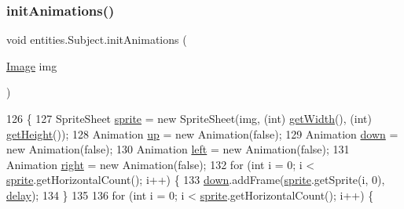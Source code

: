\subsubsection{\texorpdfstring{init\+Animations()}{initAnimations()}}
{\footnotesize\ttfamily void entities.\+Subject.\+init\+Animations (\begin{DoxyParamCaption}\item[{\mbox{\hyperlink{classorg_1_1newdawn_1_1slick_1_1_image}{Image}}}]{img }\end{DoxyParamCaption})\hspace{0.3cm}{\ttfamily [inline]}}


\begin{DoxyCode}
126                                           \{
127         SpriteSheet \mbox{\hyperlink{classentities_1_1_physical_entity_aeb439b2308ab19fb6d3ff6be6f7cdbd8}{sprite}} = \textcolor{keyword}{new} SpriteSheet(img, (\textcolor{keywordtype}{int}) \mbox{\hyperlink{classorg_1_1newdawn_1_1slick_1_1geom_1_1_rectangle_ae2fddc33461303a9ccf8854c1e93c9c1}{getWidth}}(), (\textcolor{keywordtype}{int}) 
      \mbox{\hyperlink{classorg_1_1newdawn_1_1slick_1_1geom_1_1_rectangle_a6c8878e73b4ca0d7a3c2d4e6bcd421ee}{getHeight}}());
128         Animation \mbox{\hyperlink{classentities_1_1_subject_a48b885eabce7dd717959986004da6fd8}{up}} = \textcolor{keyword}{new} Animation(\textcolor{keyword}{false});
129         Animation \mbox{\hyperlink{classentities_1_1_subject_acf3cbe158b93cc059365ae49dec13572}{down}} = \textcolor{keyword}{new} Animation(\textcolor{keyword}{false});
130         Animation \mbox{\hyperlink{classentities_1_1_subject_a79b849ac8ec3b04db878e9a15f43284b}{left}} = \textcolor{keyword}{new} Animation(\textcolor{keyword}{false});
131         Animation \mbox{\hyperlink{classentities_1_1_subject_a6a1ee4276efe4d5cc885288de3a812b0}{right}} = \textcolor{keyword}{new} Animation(\textcolor{keyword}{false});
132         \textcolor{keywordflow}{for} (\textcolor{keywordtype}{int} i = 0; i < \mbox{\hyperlink{classentities_1_1_physical_entity_aeb439b2308ab19fb6d3ff6be6f7cdbd8}{sprite}}.getHorizontalCount(); i++) \{
133             \mbox{\hyperlink{classentities_1_1_subject_acf3cbe158b93cc059365ae49dec13572}{down}}.addFrame(\mbox{\hyperlink{classentities_1_1_physical_entity_aeb439b2308ab19fb6d3ff6be6f7cdbd8}{sprite}}.getSprite(i, 0), \mbox{\hyperlink{classentities_1_1_subject_a8a1c36c716eaa9ac06e8a1081c3545a0}{delay}});
134         \}
135 
136         \textcolor{keywordflow}{for} (\textcolor{keywordtype}{int} i = 0; i < \mbox{\hyperlink{classentities_1_1_physical_entity_aeb439b2308ab19fb6d3ff6be6f7cdbd8}{sprite}}.getHorizontalCount(); i++) \{

\end{DoxyCode}
